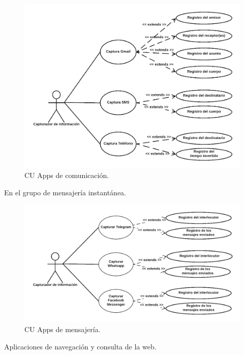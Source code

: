 \documentclass[12pt,a4paper,oneside]{book} %
\begin{document}
\begin{figure}[H]
	\begin{center}
		\includegraphics[scale=0.30]{pictures/usecases/usecases02.png} %
	\end{center}
	\caption[Casos de uso 02]{CU Apps de comunicación.}
\end{figure}
En el grupo de mensajería instantánea.
\begin{figure}[H]
	\begin{center}
		\includegraphics[scale=0.30]{pictures/usecases/usecases03.png} %
	\end{center}
	\caption[Casos de uso 03]{CU Apps de mensajería.}
\end{figure}
Aplicaciones de navegación y consulta de la web. 
\end{document}
